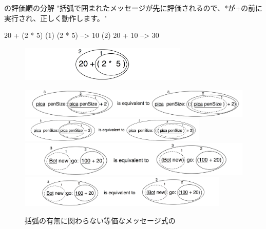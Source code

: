 \documentclass[a4paper,10pt,twoside]{book}
\begin{document}
\begin{example}[mathcorrect]{の評価順の分解}{}
"括弧で囲まれたメッセージが先に評価されるので、*が+の前に実行され、正しく動作します。"

    20 + (2 * 5) 
(1)        (2 * 5) --> 10
(2) 20 + 10      --> 30
\end{example}

\begin{figure}
\begin{center}
\includegraphics[width=8cm]{ucompoNumberBracket}
\end{center}
\end{figure}



\begin{figure}
\begin{center}
\ifluluelse
	{\includegraphics[width=\textwidth]{uKeyUnBinPar}}
	{\includegraphics[width=0.8\textwidth]{uKeyUnBinPar}}
\ifluluelse
	{\includegraphics[width=\textwidth]{uunKeyBinPar}}
	{\includegraphics[width=10cm]{uunKeyBinPar}}
\end{center}
\caption{括弧の有無に関わらない等価なメッセージ式の}
\end{figure}
\end{document}
